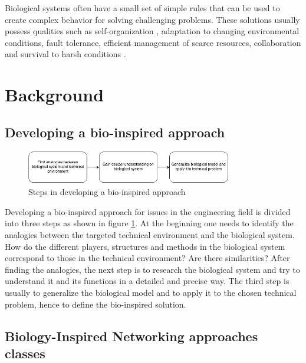 \documentclass[cameraready]{IWORK2014}
\begin{document}
Biological systems often have a small set of simple rules that can be used to create complex behavior \cite{dressler2010bio} for solving challenging problems. These solutions usually possess qualities such as self-organization \cite{kroeker2011biology}, adaptation to changing environmental conditions, fault tolerance, efficient management of scarce resources, collaboration and survival to harsh conditions \cite{dressler2010bio}.

\section{Background}

\subsection{Developing a bio-inspired approach}

\begin{figure}
    \centering
    \includegraphics[width=0.8\textwidth]{bio-inspired-steps.png}
    \caption{Steps in developing a bio-inspired approach}
    \label{fig:bio-inspired-steps}
\end{figure}

Developing a bio-inspired approach for issues in the engineering field is divided into three steps \cite{dressler2010bio} as shown in figure \ref{fig:bio-inspired-steps}. At the beginning one needs to identify the analogies between the targeted technical environment and the biological system. How do the different players, structures and methods in the biological system correspond to those in the technical environment? Are there similarities? After finding the analogies, the next step is to research the biological system and try to understand it and its functions in a detailed and precise way. The third step is usually to generalize the biological model and to apply it to the chosen technical problem, hence to define the bio-inspired solution.

\subsection{Biology-Inspired Networking approaches classes}
\end{document}
